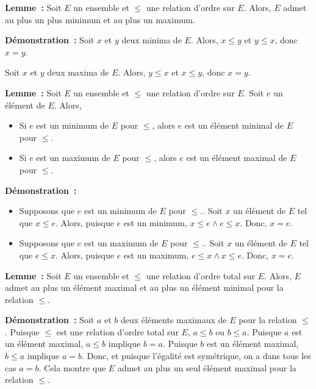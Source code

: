 \done

\medskip

\noindent\textbf{Lemme :} Soit $E$ un ensemble et $\leq$ une relation d'ordre sur $E$. 
    Alors, $E$ admet au plus un plus minimum et au plus un maximum. 

\medskip

\noindent\textbf{Démonstration :} 
    Soit $x$ et $y$ deux minima de $E$. 
    Alors, $x \leq y$ et $y \leq x$, donc $x = y$.
    
    Soit $x$ et $y$ deux maxima de $E$. 
    Alors, $y \leq x$ et $x \leq y$, donc $x = y$.

    \done

\medskip

\noindent\textbf{Lemme :} Soit $E$ un ensemble et $\leq$ une relation d'ordre sur $E$. 
    Soit $e$ un élément de $E$. 
    Alors, 
    \begin{itemize}
        \item Si $e$ est un minimum de $E$ pour $\leq$, alors $e$ est un élément minimal de $E$ pour $\leq$.
        \item Si $e$ est un maximum de $E$ pour $\leq$, alors $e$ est un élément maximal de $E$ pour $\leq$.
    \end{itemize}

\medskip

\noindent\textbf{Démonstration :} 
    \begin{itemize}
        \item Supposons que $e$ est un minimum de $E$ pour $\leq$..
            Soit $x$ un élément de $E$ tel que $x \leq e$.
            Alors, puisque $e$ est un minimum, $x \leq e \wedge e \leq x$.
            Donc, $x = e$.
        \item Supposons que $e$ est un maximum de $E$ pour $\leq$..
            Soit $x$ un élément de $E$ tel que $e \leq x$.
            Alors, puisque $e$ est un maximum, $e \leq x \wedge x \leq e$.
            Donc, $x = e$.
    \end{itemize}

    \done

\medskip

\medskip

\noindent\textbf{Lemme :} Soit $E$ un ensemble et $\leq$ une relation d'ordre total sur $E$. 
    Alors, $E$ admet au plus un élément maximal et au plus un élément minimal pour la relation $\leq$. 

\medskip

\noindent\textbf{Démonstration :} 
    Soit $a$ et $b$ deux éléments maximaux de $E$ pour la relation $\leq$.
    Puisque $\leq$ est une relation d'ordre total sur $E$, $a \leq b$ ou $b \leq a$. 
    Puisque $a$ est un élément maximal, $a \leq b$ implique $b = a$.
    Puisque $b$ est un élément maximal, $b \leq a$ implique $a = b$.
    Donc, et puisque l'égalité est symétrique, on a dans tous les cas $a = b$.
    Cela montre que $E$ admet au plus un seul élément maximal pour la relation $\leq$.
    
